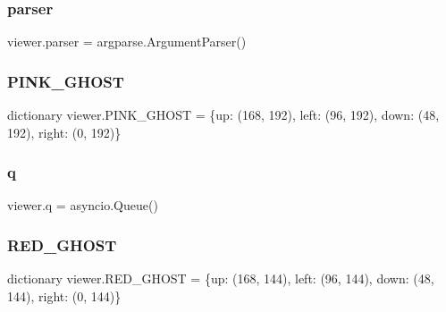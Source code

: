 \mbox{\label{namespaceviewer_a40cdbd0d97e7e53fe61800e7e504e763}} 
\subsubsection{\texorpdfstring{parser}{parser}}
{\footnotesize\ttfamily viewer.\+parser = argparse.\+Argument\+Parser()}

\mbox{\label{namespaceviewer_abe62d2acf5d0c83805fa210e5e88eca2}} 
\subsubsection{\texorpdfstring{P\+I\+N\+K\+\_\+\+G\+H\+O\+ST}{PINK\_GHOST}}
{\footnotesize\ttfamily dictionary viewer.\+P\+I\+N\+K\+\_\+\+G\+H\+O\+ST = \{\textquotesingle{}up\textquotesingle{}\+: (168, 192), \textquotesingle{}left\textquotesingle{}\+: (96, 192), \textquotesingle{}down\textquotesingle{}\+: (48, 192), \textquotesingle{}right\textquotesingle{}\+: (0, 192)\}}

\mbox{\label{namespaceviewer_a1f452bb9e64e242ae0cf6089e85cf1ca}} 
\subsubsection{\texorpdfstring{q}{q}}
{\footnotesize\ttfamily viewer.\+q = asyncio.\+Queue()}

\mbox{\label{namespaceviewer_a49becc796180fd2036cad73589a3cfcc}} 
\subsubsection{\texorpdfstring{R\+E\+D\+\_\+\+G\+H\+O\+ST}{RED\_GHOST}}
{\footnotesize\ttfamily dictionary viewer.\+R\+E\+D\+\_\+\+G\+H\+O\+ST = \{\textquotesingle{}up\textquotesingle{}\+: (168, 144), \textquotesingle{}left\textquotesingle{}\+: (96, 144), \textquotesingle{}down\textquotesingle{}\+: (48, 144), \textquotesingle{}right\textquotesingle{}\+: (0, 144)\}}

